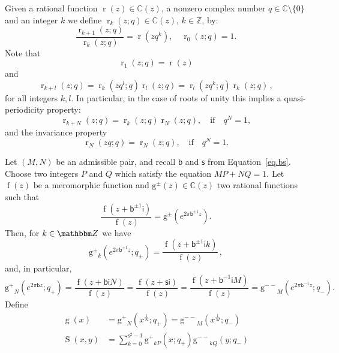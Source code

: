 \documentclass[12pt]{amsart}
\theoremstyle{definition}
\def\BZ{\mathbbm Z}
\newcommand{\im}{\mathsf{i}}
\begin{document}
Given a rational function $\operatorname{r}(z)\in\mathbb{C}(z)$, 
a nonzero complex number $q\in\mathbb{C}\setminus\{0\}$ and an integer
$k$ we define $\operatorname{r}_k(z;q)\in\mathbb{C}(z)$, $k\in\mathbb{Z}$,  
by:
\begin{equation}
\label{rk}
\frac{\operatorname{r}_{k+1}(z;q)}{\operatorname{r}_k(z;q)}
=\operatorname{r}(zq^k),\quad \operatorname{r}_0(z;q)=1.
\end{equation}
Note that
\begin{equation}
\operatorname{r}_{1}(z;q)=\operatorname{r}(z)
\end{equation}
and 
\begin{equation}
\operatorname{r}_{k+l}(z;q)
=\operatorname{r}_k(zq^l;q)\operatorname{r}_l(z;q)
=\operatorname{r}_l(zq^k;q)\operatorname{r}_k(z;q)\,,
\end{equation}
for all integers $k,l$. In particular, 
in the case of roots of unity this implies a quasi-periodicity property:
\begin{equation}
\operatorname{r}_{k+N}(z;q)=\operatorname{r}_k(z;q)\operatorname{r}_N(z;q),
\quad \text{if}\quad q^N=1,
\end{equation}
and the invariance property
\begin{equation}
\operatorname{r}_{N}(zq;q)=\operatorname{r}_N(z;q),\quad \text{if}\quad q^N=1.
\end{equation}

Let $(M,N)$ be an admissible pair, and recall $\mathsf{b}$ and 
$\mathsf{s}$ from Equation~\eqref{eq.bs}.
Choose two integers $P$ and $Q$ which satisfy the equation $MP+NQ=1$. 
Let $\operatorname{f}(z)$ be a meromorphic function and 
$\operatorname{g^\pm}(z)\in\mathbb{C}(z)$ two rational functions such that
\begin{equation}
\frac{\operatorname{f}(z+\mathsf{b}^{\pm1}\im)}{\operatorname{f}(z)}=
\operatorname{g^\pm}\!\left(e^{2\pi\mathsf{b}^{\pm1}z}\right).
\end{equation}
Then, for $k \in \BZ$ we have
\begin{equation}
\operatorname{g^\pm}_k\!\left(e^{2\pi\mathsf{b}^{\pm1}z};q_{\pm}\right)
=\frac{\operatorname{f}(z+\mathsf{b}^{\pm1}\im k)}{\operatorname{f}(z)}\,,
\end{equation}
and, in particular,
\begin{equation}
\operatorname{g^+}_{N}\!\left(e^{2\pi\mathsf{b}z};q_+\right)
= \frac{\operatorname{f}(z+\mathsf{b}\im N)}{\operatorname{f}(z)}
=\frac{\operatorname{f}(z+\mathsf{s}\im )}{\operatorname{f}(z)}
=\frac{\operatorname{f}(z+\mathsf{b}^{-1}\im M)}{\operatorname{f}(z)}=
\operatorname{g^{--}}_{M}\!\left(e^{2\pi\mathsf{b}^{-1}z};q_-\right).
\end{equation}
Define
\begin{align}
\label{gx}\operatorname{g}\!\left(x\right) &= 
\operatorname{g^+}_{N}\!\left(x^{\frac1N};q_+\right)= 
\operatorname{g^{--}}_{M}\!\left(x^{\frac1M};q_-\right)
\\
\label{sxy}\operatorname{S}(x,y)&= 
\sum_{k=0}^{\mathsf{s}^2-1}\operatorname{g^+}_{kP}\!
\left(x;q_+\right)\operatorname{g^{--}}_{kQ}\!
\left(y;q_-\right)
\end{align}
\end{document}
